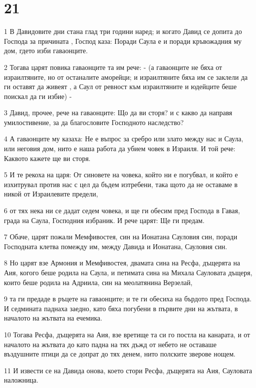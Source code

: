 \chapter{21}

\par 1 В Давидовите дни стана глад три години наред; и когато Давид се допита до Господа за причината , Господ каза: Поради Саула е и поради кръвожадния му дом, гдето изби гаваонците.
\par 2 Тогава царят повика гаваонците та им рече: - (а гаваонците не бяха от израилтяните, но от останалите аморейци; и израилтяните бяха им се заклели да ги оставят да живеят , а Саул от ревност към израилтяните и юдейците беше поискал да ги избие) -
\par 3 Давид, прочее, рече на гаваонците: Що да ви сторя? и с какво да направя умилостивение, за да благословите Господното наследство?
\par 4 А гаваонците му казаха: Не е въпрос за сребро или злато между нас и Саула, или неговия дом, нито е наша работа да убием човек в Израиля. И той рече: Каквото кажете ще ви сторя.
\par 5 И те рекоха на царя: От синовете на човека, който ни е погубвал, и който е изхитрувал против нас с цел да бъдем изтребени, така щото да не оставаме в никой от Израилевите предели,
\par 6 от тях нека ни се дадат седем човека, и ще ги обесим пред Господа в Гавая, града на Саула, Господния избраник. И рече царят: Ще ги предам.
\par 7 Обаче, царят пожали Мемфивостея, син на Ионатана Сауловия син, поради Господната клетва помежду им, между Давида и Ионатана, Сауловия син.
\par 8 Но царят взе Армония и Мемфивостея, двамата сина на Ресфа, дъщерята на Аия, когого беше родила на Саула, и петимата сина на Михала Сауловата дъщеря, които беше родила на Адриила, син на меолатянина Верзелай,
\par 9 та ги предаде в ръцете на гаваонците; и те ги обесиха на бърдото пред Господа. И седмината паднаха заедно, като бяха погубени в първите дни на жътвата, в началото на жътвата на ечемика.
\par 10 Тогава Ресфа, дъщерята на Аия, взе вретище та си го постла на канарата, и от началото на жътвата до като падна на тях дъжд от небето не оставаше въздушните птици да се допрат до тях денем, нито полските зверове нощем.
\par 11 И извести се на Давида онова, което стори Ресфа, дъщерята на Аия, Сауловата наложница.
